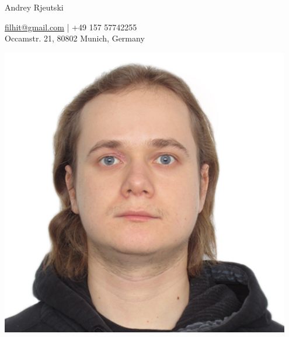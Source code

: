\documentclass[a4paper,11pt]{article}
\begin{document}
  \begin{minipage}{0.69\textwidth}
    \begin{centering}
      {\Huge Andrey Rjeutski}

      \href{mailto:filhit@gmail.com}{filhit@gmail.com} | +49 157 57742255\\
      Occamstr. 21, 80802 Munich, Germany
	  
	\end{centering}
  \end{minipage}
  \begin{minipage}{0.3\textwidth}
    \includegraphics[width=0.95\textwidth]{photo}
  \end{minipage}
  
\end{document}
